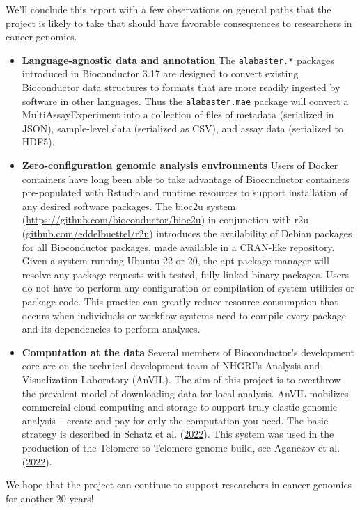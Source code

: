 We'll conclude this report with a few observations on
general paths that the project is likely to take that
should have favorable consequences to researchers in
cancer genomics.

\begin{itemize}
\item
  \textbf{Language-agnostic data and annotation} The \texttt{alabaster.*} packages
  introduced in Bioconductor 3.17 are designed to convert existing
  Bioconductor data structures to formats that are more readily ingested
  by software in other languages. Thus the \texttt{alabaster.mae}
  package will convert a MultiAssayExperiment into a collection
  of files of metadata (serialized in JSON), sample-level data
  (serialized as CSV), and assay data (serialized to HDF5).
\item
  \textbf{Zero-configuration genomic analysis environments} Users
  of Docker containers have long been able to take advantage of
  Bioconductor containers pre-populated with Rstudio and runtime
  resources to support installation of any desired software packages.
  The bioc2u system (\url{https://github.com/bioconductor/bioc2u}) in conjunction
  with r2u (\url{github.com/eddelbuettel/r2u}) introduces the
  availability of Debian packages for all Bioconductor packages,
  made available in a CRAN-like repository. Given a system running
  Ubuntu 22 or 20, the apt package manager will resolve any package
  requests with tested, fully linked binary packages. Users do not
  have to perform any configuration or compilation of system
  utilities or package code. This practice can greatly reduce
  resource consumption that occurs when individuals or
  workflow systems need to compile
  every package and its dependencies to perform analyses.
\item
  \textbf{Computation at the data} Several members of Bioconductor's
  development core are on the technical development team of
  NHGRI's Analysis and Visualization Laboratory (AnVIL). The aim
  of this project is to overthrow the prevalent model of downloading data for
  local analysis. AnVIL mobilizes commercial cloud computing and
  storage to support truly elastic genomic analysis -- create and
  pay for only the computation you need. The basic
  strategy is described in Schatz et al. (\protect\hyperlink{ref-Schatz2022}{2022}). This system was
  used in the production of the Telomere-to-Telomere
  genome build, see Aganezov et al. (\protect\hyperlink{ref-Aganezov2022}{2022}).
\end{itemize}

We hope that the project can continue to support researchers in cancer
genomics for another 20 years!

%
